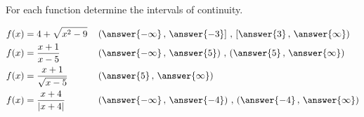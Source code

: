\documentclass{ximera}
\author{Nela Lakos \and Kyle Parsons}
\begin{document}
\begin{exercise}

For each function determine the intervals of continuity.

\begin{align*}
f(x) &= 4+\sqrt{x^2-9} && \left(\answer{-\infty}\, , \, \answer{-3}\right] \, , \, \left[\answer{3}\, , \, \answer{\infty}\right)\\
f(x) &= \frac{x+1}{x-5} && \left(\answer{-\infty}\, , \,\answer{5}\right) \, , \, \left(\answer{5}\, , \,\answer{\infty}\right)\\
f(x) &= \frac{x+1}{\sqrt{x-5}} && \left(\answer{5}\, , \, \answer{\infty}\right)\\
f(x) &= \frac{x+4}{\left|x+4\right|} && \left(\answer{-\infty}\, , \,\answer{-4}\right) \, , \, \left(\answer{-4}\, , \,\answer{\infty}\right)
\end{align*}

\end{exercise}
\end{document}
